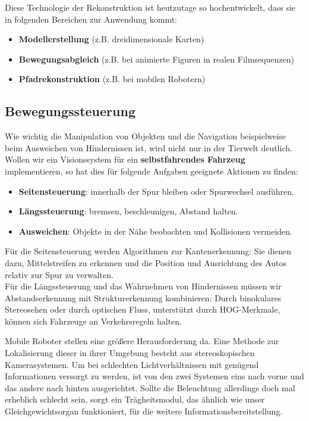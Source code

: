 Diese Technologie der Rekonstruktion ist heutzutage so hochentwickelt, dass sie in folgenden Bereichen zur Anwendung kommt:
\begin{itemize}
  \item \textbf{Modellerstellung} (z.B. dreidimensionale Karten)
  \item \textbf{Bewegungsabgleich} (z.B. bei animierte Figuren in realen Filmsequenzen)
  \item \textbf{Pfadrekonstruktion} (z.B. bei mobilen Robotern)
\end{itemize}


\subsection{Bewegungssteuerung}
Wie wichtig die Manipulation von Objekten und die Navigation beispielweise beim Ausweichen von Hindernissen ist, wird nicht nur in der Tierwelt deutlich. Wollen wir ein Visionssystem für ein \textbf{selbstfahrendes Fahrzeug} implementieren, so hat dies für folgende Aufgaben geeignete Aktionen zu finden:
\begin{itemize}
  \item \textbf{Seitensteuerung}: innerhalb der Spur bleiben oder Spurwechsel ausführen.
  \item \textbf{Längssteuerung}: bremsen, beschleunigen, Abstand halten.
  \item \textbf{Ausweichen}: Objekte in der Nähe beobachten und Kollisionen vermeiden.
\end{itemize}
Für die Seitensteuerung werden Algorithmen zur Kantenerkennung: Sie dienen dazu, Mittelstreifen zu erkennen und die Position und Ausrichtung des Autos relativ zur Spur zu verwalten.\\
Für die Längssteuerung und das Wahrnehmen von Hindernissen müssen wir Abstandserkennung mit Strukturerkennung kombinieren: Durch binokulares Stereosehen oder durch optischen Fluss, unterstützt durch HOG-Merkmale, können sich Fahrzeuge an Verkehrsregeln halten.

Mobile Roboter stellen eine größere Herausforderung da. Eine Methode zur Lokalisierung dieser in ihrer Umgebung besteht aus stereoskopischen Kamerasystemen. Um bei schlechten Lichtverhältnissen mit genügend Informationen versorgt zu werden, ist von den zwei Systemen eins nach vorne und das andere nach hinten ausgerichtet. Sollte die Beleuchtung allerdings doch mal erheblich schlecht sein, sorgt ein Trägheitsmodul, das ähnlich wie unser Gleichgewichtsorgan funktioniert, für die weitere Informationsbereitstellung.


